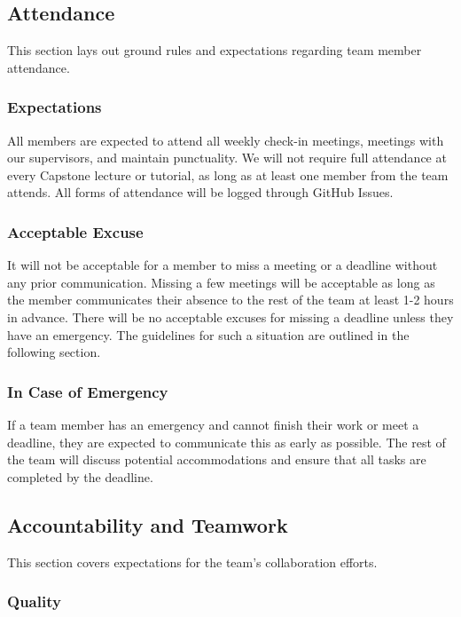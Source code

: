 \documentclass{article}
\begin{document}
\subsection*{Attendance}

This section lays out ground rules and expectations regarding team member
attendance.

\subsubsection*{Expectations}

All members are expected to attend all weekly check-in meetings, meetings with
our supervisors, and maintain punctuality. We will not require full attendance
at every Capstone lecture or tutorial, as long as at least one member from the
team attends. All forms of attendance will be logged through GitHub Issues.

\subsubsection*{Acceptable Excuse}

It will not be acceptable for a member to miss a meeting or a deadline without
any prior communication. Missing a few meetings will be acceptable as long as
the member communicates their absence to the rest of the team at least 1-2 hours
in advance. There will be no acceptable excuses for missing a deadline unless
they have an emergency. The guidelines for such a situation are outlined in the
following section.

\subsubsection*{In Case of Emergency}

If a team member has an emergency and cannot finish their work or meet a
deadline, they are expected to communicate this as early as possible. The rest
of the team will discuss potential accommodations and ensure that all tasks are
completed by the deadline.

\subsection*{Accountability and Teamwork}

This section covers expectations for the team's collaboration efforts.

\subsubsection*{Quality} 
\end{document}
